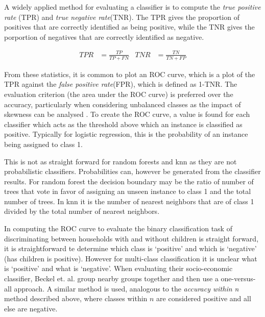 A widely applied method for evaluating a classifier is to compute the \textit{true positive rate} (TPR) and \textit{true negative rate}(TNR). The TPR gives the proportion of positives that are correctly identified as being positive, while the TNR gives the porportion of negatives that are correctly identified as negative.

\begin{align*}
TPR&=\frac{TP}{TP+FN}   &   TNR&=\frac{TN}{TN+FP}   
\end{align*}

From these statistics, it is common to plot an ROC curve, which is a plot of the TPR against the \textit{false positive rate}(FPR), which is defined as 1-TNR. The evaluation criterion (the area under the ROC curve) is preferred over the accuracy, particularly when considering unbalanced classes as the impact of skewness can be analysed \cite{Waegeman}. To create the ROC curve, a value is found for each classifier which acts as the threshold above which an instance is classified as positive. Typically for logistic regression, this is the probability of an instance being assigned to class 1.

This is not as straight forward for random forests and knn as they are not probabilistic classifiers. Probabilities can, however be generated from the classifier results. For random forest the decision boundary may be the ratio of number of trees that vote in favor of assigning an unseen instance to class 1 and the total number of trees. In knn it is the number of nearest neighbors that are of class 1 divided by the total number of nearest neighbors.

In computing the ROC curve to evaluate the binary classification task of discriminating between households with and without children is straight forward, it is straightforward te determine which class is `positive' and which is `negative' (has children is positive). However for multi-class classification it is unclear what is `positive' and what is `negative'. When evaluating their socio-economic classifier, Beckel et. al. group nearby groups together and then use a one-versus-all approach\cite{Beckel_2,Beckel_3}. A similar method is used, analogous to the \textit{accuracy within n} method described above, where classes within $n$ are considered positive and all else are negative.


